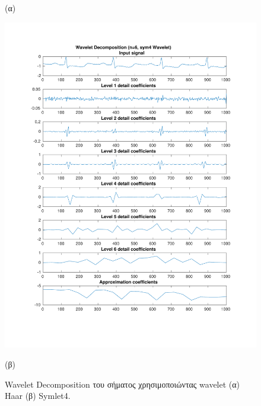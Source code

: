 \documentclass[11pt,a4paper]{article}
\begin{document}
\begin{figure}[H]
\begin{minipage}{0.48\textwidth}
	(α)
\end{minipage}
\begin{minipage}{0.48\textwidth}
	\centering
	\includegraphics[width=\textwidth]{fig/112l1_dwt2.pdf}
	
	(β)
\end{minipage}
\vfill
\caption{Wavelet Decomposition του σήματος χρησιμοποιώντας wavelet (α) Haar (β) Symlet4.}
\label{fig:112l1_dwt}
\end{figure}
\end{document}
